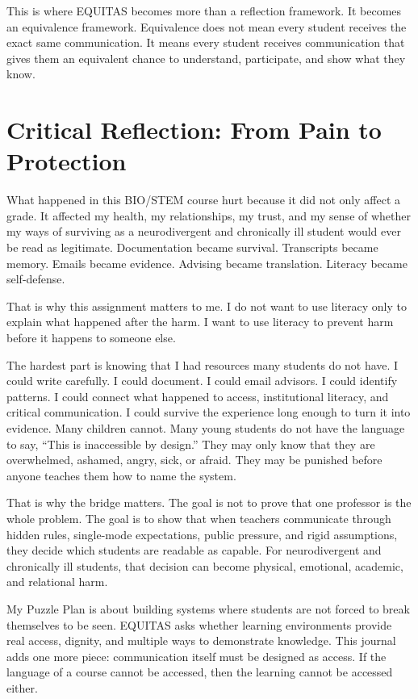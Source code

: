 \documentclass[12pt]{article}
\begin{document}
This is where EQUITAS becomes more than a reflection framework. It becomes an equivalence framework. Equivalence does not mean every student receives the exact same communication. It means every student receives communication that gives them an equivalent chance to understand, participate, and show what they know.

\section*{Critical Reflection: From Pain to Protection}

What happened in this BIO/STEM course hurt because it did not only affect a grade. It affected my health, my relationships, my trust, and my sense of whether my ways of surviving as a neurodivergent and chronically ill student would ever be read as legitimate. Documentation became survival. Transcripts became memory. Emails became evidence. Advising became translation. Literacy became self-defense.

That is why this assignment matters to me. I do not want to use literacy only to explain what happened after the harm. I want to use literacy to prevent harm before it happens to someone else.

The hardest part is knowing that I had resources many students do not have. I could write carefully. I could document. I could email advisors. I could identify patterns. I could connect what happened to access, institutional literacy, and critical communication. I could survive the experience long enough to turn it into evidence. Many children cannot. Many young students do not have the language to say, ``This is inaccessible by design.'' They may only know that they are overwhelmed, ashamed, angry, sick, or afraid. They may be punished before anyone teaches them how to name the system.

That is why the bridge matters. The goal is not to prove that one professor is the whole problem. The goal is to show that when teachers communicate through hidden rules, single-mode expectations, public pressure, and rigid assumptions, they decide which students are readable as capable. For neurodivergent and chronically ill students, that decision can become physical, emotional, academic, and relational harm.

My Puzzle Plan is about building systems where students are not forced to break themselves to be seen. EQUITAS asks whether learning environments provide real access, dignity, and multiple ways to demonstrate knowledge. This journal adds one more piece: communication itself must be designed as access. If the language of a course cannot be accessed, then the learning cannot be accessed either.
\end{document}
